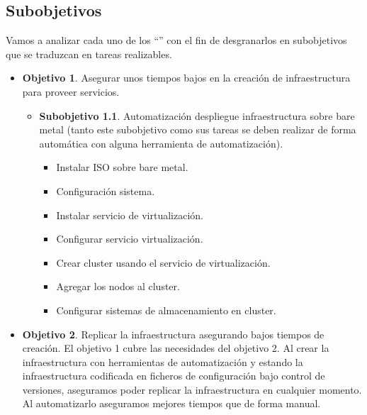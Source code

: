 	\subsection{Subobjetivos}
	\label{subobjetivos}
		\begin{text}
			Vamos a analizar cada uno de los ``'' con el fin de desgranarlos en subobjetivos que se traduzcan en tareas realizables. 
			\begin{itemize}
				\item \textbf{Objetivo 1}. Asegurar unos tiempos bajos en la creación de infraestructura para proveer servicios.
				\begin{itemize}
					\item \textbf{Subobjetivo 1.1}. Automatización despliegue infraestructura sobre bare metal (tanto este subobjetivo como sus tareas se deben realizar de forma automática con alguna herramienta de automatización).
					\begin{itemize}
						\item Instalar ISO sobre bare metal.
						\item Configuración sistema.
						\item Instalar servicio de virtualización.
						\item Configurar servicio virtualización.
						\item Crear cluster usando el servicio de virtualización.
						\item Agregar los nodos al cluster.
						\item Configurar sistemas de almacenamiento en cluster.
					\end{itemize}
				\end{itemize}
				\item \textbf{Objetivo 2}. Replicar la infraestructura asegurando bajos tiempos de creación. El objetivo 1 cubre las necesidades del objetivo 2. Al crear la infraestructura con herramientas de automatización y estando la infraestructura codificada en ficheros de configuración bajo control de versiones, aseguramos poder replicar la infraestructura en cualquier momento. Al automatizarlo aseguramos mejores tiempos que de forma manual.
				

\end{itemize}
\end{text}
